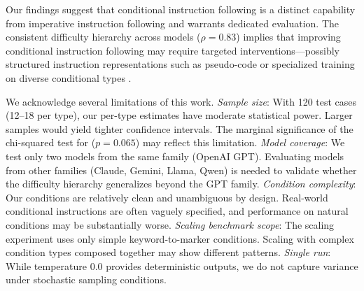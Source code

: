 Our findings suggest that conditional instruction following is a distinct capability from imperative instruction following and warrants dedicated evaluation. The consistent difficulty hierarchy across models ($\rho = 0.83$) implies that improving conditional instruction following may require targeted interventions---possibly structured instruction representations such as pseudo-code \citep{kumar2025pseudocode} or specialized training on diverse conditional types \citep{zhang2024onlyif}.

We acknowledge several limitations of this work.
\emph{Sample size}: With 120 test cases (12--18 per type), our per-type estimates have moderate statistical power. Larger samples would yield tighter confidence intervals. The marginal significance of the chi-squared test for \gptlarge ($p = 0.065$) may reflect this limitation.
\emph{Model coverage}: We test only two models from the same family (OpenAI GPT). Evaluating models from other families (Claude, Gemini, Llama, Qwen) is needed to validate whether the difficulty hierarchy generalizes beyond the GPT family.
\emph{Condition complexity}: Our conditions are relatively clean and unambiguous by design. Real-world conditional instructions are often vaguely specified, and performance on natural conditions may be substantially worse.
\emph{Scaling benchmark scope}: The scaling experiment uses only simple keyword-to-marker conditions. Scaling with complex condition types composed together may show different patterns.
\emph{Single run}: While temperature 0.0 provides deterministic outputs, we do not capture variance under stochastic sampling conditions.
